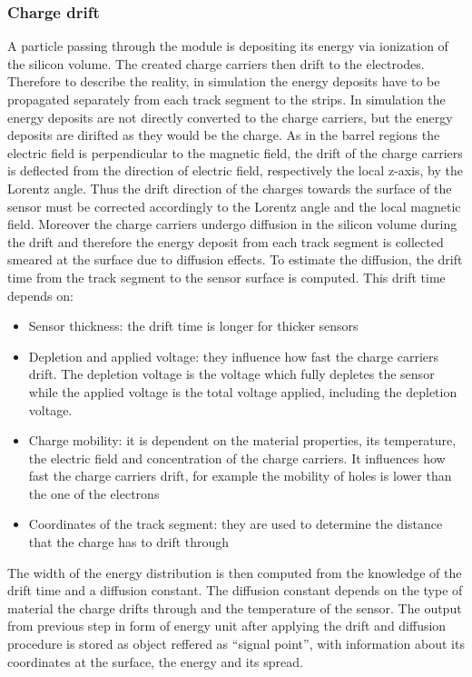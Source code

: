 \subsubsection{Charge drift~\label{sec:drift}}

A particle passing through the module is depositing its energy via ionization of the silicon volume. The created charge carriers then drift to the electrodes. Therefore to describe the reality, in simulation the energy deposits have to be propagated separately from each track segment to the strips. In simulation the energy deposits are not directly converted to the charge carriers, but the energy deposits are dirifted as they would be the charge. As in the barrel regions the electric field is perpendicular to the magnetic field, the drift of the charge carriers is deflected from the direction of electric field, respectively the local z-axis, by the Lorentz angle. Thus the drift direction of the charges towards the surface of the sensor must be corrected accordingly to the Lorentz angle and the local magnetic field. Moreover the charge carriers undergo diffusion in the silicon volume during the drift and therefore the energy deposit from each track segment is collected smeared at the surface due to diffusion effects. To estimate the diffusion, the drift time from the track segment to the sensor surface is computed. This drift time depends on:

\begin{itemize}
\item Sensor thickness: the drift time is longer for thicker sensors
\item Depletion and applied voltage: they influence how fast the charge carriers drift. The depletion voltage is the voltage which fully depletes the sensor while the applied voltage is the total voltage applied, including the depletion voltage.
\item Charge mobility: it is dependent on the material properties, its temperature, the electric field and concentration of the charge carriers. It influences how fast the charge carriers drift, for example the mobility of holes is lower than the one of the electrons
\item Coordinates of the track segment: they are used to determine the distance that the charge  has to drift through
\end{itemize}

The width of the energy distribution is then computed from the knowledge of the drift time and a diffusion constant. The diffusion constant depends on the type of material the charge drifts through and the temperature of the sensor. The output from previous step in form of energy unit after applying the drift and diffusion procedure is stored as object reffered as ``signal point'', with information about its coordinates at the surface, the energy and its spread.


